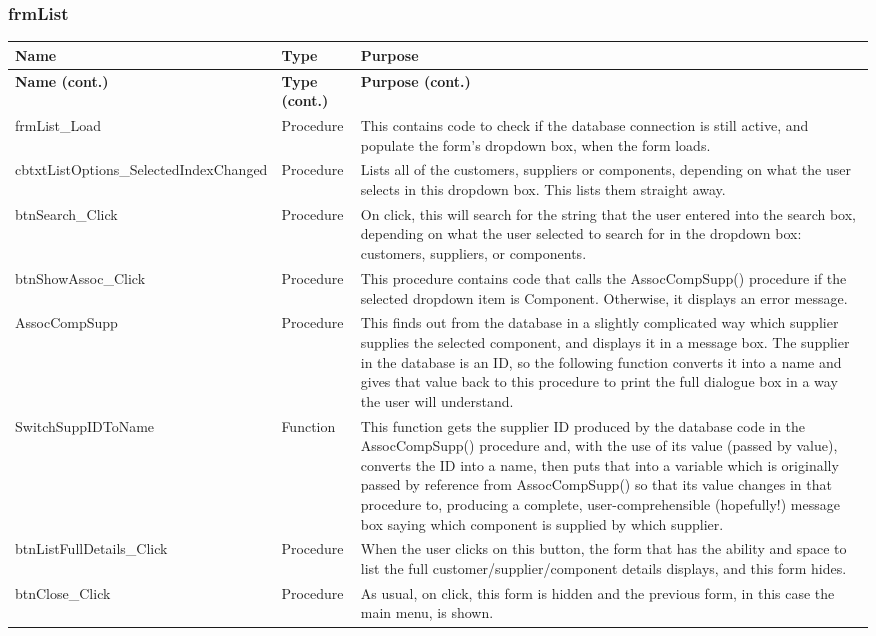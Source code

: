 	\subsubsection{frmList}
	\begin{longtable}{ | p{4cm} | p{3cm} | p{10cm} | }
		\hline
		\textbf{Name} & \textbf{Type} & \textbf{Purpose}\\
		\endfirsthead
		\hline
		\textbf{Name (cont.)} & \textbf{Type (cont.)} & \textbf{Purpose (cont.)}\\
		\endhead
		\hline
		frmList\_Load & Procedure & This contains code to check if the database connection is still active, and populate the form's dropdown box, when the form loads.\\
		\hline
		cbtxtListOptions\_SelectedIndexChanged & Procedure & Lists all of the customers, suppliers or components, depending on what the user selects in this dropdown box.  This lists them straight away.\\
		\hline
		btnSearch\_Click & Procedure & On click, this will search for the string that the user entered into the search box, depending on what the user selected to search for in the dropdown box: customers, suppliers, or components.\\
		\hline
		btnShowAssoc\_Click & Procedure & This procedure contains code that calls the AssocCompSupp() procedure if the selected dropdown item is Component.  Otherwise, it displays an error message.\\
		\hline
		AssocCompSupp & Procedure & This finds out from the database in a slightly complicated way which supplier supplies the selected component, and displays it in a message box.  The supplier in the database is an ID, so the following function converts it into a name and gives that value back to this procedure to print the full dialogue box in a way the user will understand.\\
		\hline
		SwitchSuppIDToName & Function & This function gets the supplier ID produced by the database code in the AssocCompSupp() procedure and, with the use of its value (passed by value), converts the ID into a name, then puts that into a variable which is originally passed by reference from AssocCompSupp() so that its value changes in that procedure to, producing a complete, user-comprehensible (hopefully!) message box saying which component is supplied by which supplier.\\
		\hline
		btnListFullDetails\_Click & Procedure & When the user clicks on this button, the form that has the ability and space to list the full customer\slash supplier\slash component details displays, and this form hides.\\
		\hline
		btnClose\_Click & Procedure & As usual, on click, this form is hidden and the previous form, in this case the main menu, is shown.\\
		\hline
	\end{longtable}
	
